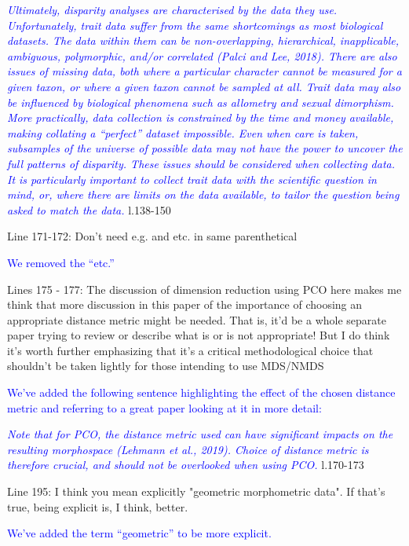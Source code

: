 \documentclass[12pt,letterpaper]{article}
\begin{document}
\textcolor{blue}{\textit{Ultimately, disparity analyses are characterised by the data they use. Unfortunately, trait data suffer from the same shortcomings as most biological datasets. The data within them can be non-overlapping, hierarchical, inapplicable, ambiguous, polymorphic, and/or correlated  (Palci and Lee, 2018). There are also issues of missing data, both where a particular character cannot be measured for a given taxon, or where a given taxon cannot be sampled at all. Trait data may also be influenced by biological phenomena such as allometry and sexual dimorphism. More practically, data collection is constrained by the time and money available, making collating a ``perfect'' dataset impossible. Even when care is taken, subsamples of the universe of possible data may not have the power to uncover the full patterns of disparity. These issues should be considered when collecting data. It is particularly important to collect trait data with the scientific question in mind, or, where there are limits on the data available, to tailor the question being asked to match the data.}} l.138-150 %

\noindent Line 171-172: Don't need e.g. and etc. in same parenthetical

\textcolor{blue}{We removed the  ``etc.''}

\noindent Lines 175 - 177: The discussion of dimension reduction using PCO here makes me think that more discussion in this paper of the importance of choosing an appropriate distance metric might be needed. That is, it'd be a whole separate paper trying to review or describe what is or is not appropriate! But I do think it's worth further emphasizing that it's a critical methodological choice that shouldn't be taken lightly for those intending to use MDS/NMDS

\textcolor{blue}{We've added the following sentence highlighting the effect of the chosen distance metric and referring to a great paper looking at it in more detail:}

\textcolor{blue}{\textit{Note that for PCO, the distance metric used can have significant impacts on the resulting morphospace (Lehmann et al., 2019). Choice of distance metric is therefore crucial, and should not be overlooked when using PCO.}} l.170-173 %


\noindent Line 195: I think you mean explicitly "geometric morphometric data". If that's true, being explicit is, I think, better.

\textcolor{blue}{We've added the term ``geometric'' to be more explicit.}
\end{document}
